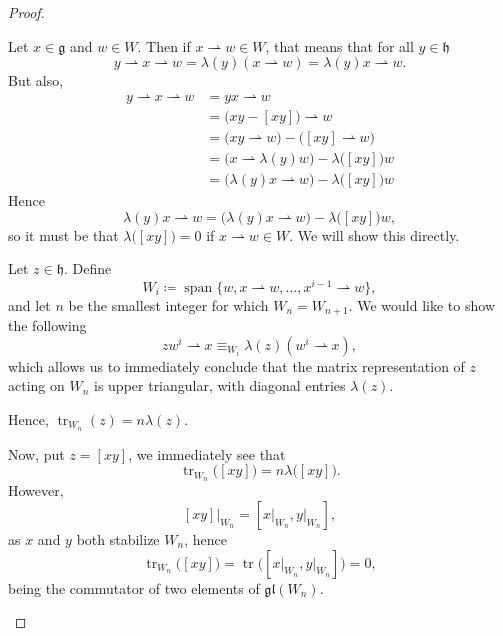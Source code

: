 \documentclass{article}
\newcommand{\lb}[1]{\ensuremath{\left[{#1}\right]}}
\DeclareMathOperator{\tr}{tr}
\DeclareMathOperator{\opspan}{span}
\newcommand*\frkg{{\ensuremath{\mathfrak{g}}}}
\newcommand*\frkh{{\ensuremath{\mathfrak{h}}}}
\newcommand*\glalg{\ensuremath{\mathfrak{gl}}}
\newcommand*\acts{\ensuremath{\rightharpoonup}}
\begin{document}
\begin{proof}
\begin{itemize}
            Let $x \in \frkg$ and $w \in W$.
            Then if $x \acts w \in W$, that means that for all $y \in \frkh$
            \[
                y \acts x \acts w
                =
                \lambda(y)(x \acts w)
                =
                \lambda(y)x \acts w.
            \]
            But also,
            \begin{align*}
                y \acts x \acts w
                &=
                yx \acts w
                \\
                &=
                \Big(xy - \lb{xy}\Big) \acts w
                \\
                &=
                \Big(
                    xy \acts w
                \Big)
                -
                \Big(
                    \lb{xy} \acts w
                \Big)
                \\
                &=
                \Big(
                    x \acts \lambda(y)w
                \Big)
                -
                \lambda\Big(\lb{xy}\Big) w
                \\
                &=
                \Big(
                    \lambda(y)x \acts w
                \Big)
                -
                \lambda\Big(\lb{xy}\Big) w
            \end{align*}
            Hence
            \[
                \lambda(y)x \acts w
                =
                \Big(
                    \lambda(y)x \acts w
                \Big)
                - \lambda\Big(\lb{xy}\Big) w
                ,
            \]
            so it must be that $\lambda\Big(\lb{xy}\Big) = 0$ if $x \acts w \in W$.
            We will show this directly.

            Let $z \in \frkh$.
            Define
            \[
                W_i
                \coloneq
                \opspan\{w, x \acts w, \ldots, x^{i-1} \acts w\},
            \]
            and let $n$ be the smallest integer for which $W_n = W_{n+1}$.
            We would like to show the following
            \[
                zw^i \acts x
                \equiv_{W_i}
                \lambda(z)(w^i \acts x),
            \]
            which allows us to immediately conclude that the matrix representation of $z$ acting on $W_n$ is upper triangular, with diagonal entries $\lambda(z)$.

            Hence, $\tr_{W_n}(z) = n\lambda(z)$.

            Now, put $z = \lb{xy}$, we immediately see that
            \[
                \tr_{W_n}\Big(\lb{xy}\Big)
                =
                n\lambda\Big(\lb{xy}\Big).
            \]
            However,
            \[
                \lb{xy}\Big\rvert_{W_n}
                =
                \lb{
                    x \rvert_{W_n},
                    y \rvert_{W_n}
                },
            \]
            as $x$ and $y$ both stabilize $W_n$, hence
            \[
                \tr_{W_n}\Big(\lb{xy}\Big)
                =
                \tr\Big(\lb{
                    x \rvert_{W_n},
                    y \rvert_{W_n}
                }\Big)
                =
                0,
            \]
            being the commutator of two elements of $\glalg(W_n)$.


\end{itemize}
\end{proof}
\end{document}
